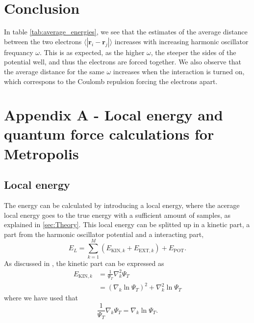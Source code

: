 \documentclass[norsk,a4paper,12pt]{article}
\begin{document}
\section{Conclusion} \label{sec:Conclusion}

In table \ref{tab:average_energies}, we see that the estimates of the average distance between the two electrons $\langle |\boldsymbol{r}_i-\boldsymbol{r}_j|\rangle$ increases with increasing harmonic oscillator frequancy $\omega$. This is as expected, as the higher $\omega$, the steeper the sides of the potential well, and thus the electrons are forced together. We also observe that the average distance for the same $\omega$ increases when the interaction is turned on, which correspons to the Coulomb repulsion forcing the electrons apart. 


\newpage

\section{Appendix A - Local energy and quantum force calculations for Metropolis} \label{sec:appendix_A}

\subsection{Local energy}

The energy can be calculated by introducing a local energy, where the acerage local energy goes to the true energy with a sufficient amount of samples, as explained in \ref{sec:Theory}. This local energy can be splitted up in a kinetic part, a part from the harmonic oscillator potential and a interacting part,
\begin{equation}
E_L=\sum_{k=1}^{M}(E_{\text{KIN},k} + E_{\text{EXT},k})+E_{\text{POT}}.
\end{equation}
As discussed in \cite{Nordhagen}, the kinetic part can be expressed as
\begin{align}
E_{\text{KIN},k}&=\frac{1}{\Psi_T}\nabla_k^2\Psi_T\\
&=(\nabla_k\ln\Psi_T)^2+\nabla_k^2\ln\Psi_T
\end{align}
where we have used that
\begin{equation}
\frac{1}{\Psi_T}\nabla_k\Psi_T=\nabla_k\ln\Psi_T.
\end{equation}
\end{document}
